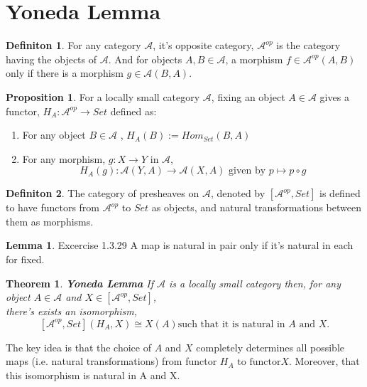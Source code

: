 \documentclass[18pt,a4paper]{article}
\newtheorem{theorem}{Theorem}[section]
\theoremstyle{definition}
\newtheorem{definition}{Definiton}[section]
\newtheorem{lemma}{Lemma}[definition]
\newtheorem{proop}{Proposition}[section]
\begin{document}
\section{Yoneda Lemma} %
\begin{definition} %
For any category $\mathcal{A} $, it's opposite category, $\mathcal{A}^{op}$
is the category having the objects of $\mathcal{A}$.
And for objects $A,B \in \mathcal{A} $, a morphism $f \in \mathcal{A}^{op} (A,B)$
only if there is a morphism $g \in \mathcal{A}(B,A)$.
\end{definition}

\begin{proop} %
	For a locally small category $\mathcal{A}$, fixing an object $A \in \mathcal{A} $ gives
	a functor, $H_A: \mathcal{A} ^{op} \rightarrow Set$ defined as:
	\begin{enumerate}[label=(\roman*)]
		\item For any object $B \in \mathcal{A} $ , $H_A(B):=Hom_{Set}(B,A)$
		\item For any morphism, $g : X \rightarrow Y $ in $\mathcal{A}$,
			\[H_A(g): \mathcal{A} (Y,A) \rightarrow \mathcal{A}(X,A)
				\text{ given by } p \mapsto p \circ g\]
	\end{enumerate}
\end{proop}
\begin{definition} %
	The category of presheaves on $\mathcal{A} $, denoted by $[\mathcal{A} ^{op},Set]$
	is defined to have functors from $\mathcal{A} ^{op}$ to $Set$ as objects,
	and natural transformations between them as morphisms.
\end{definition}

\begin{lemma}
	Excercise 1.3.29 A map is natural in pair only if it's natural in each for fixed.
\end{lemma}

\begin{theorem}{\textbf{Yoneda Lemma}} %
	If $\mathcal{A} $ is a locally small category then, for any object $A \in \mathcal{A} $
	and $X \in [ \mathcal{A}^{op},Set]$,\\ there's exists an isomorphism,
	\[ [ \mathcal{A} ^{op},Set ](H_A,X)\cong X(A) \text{such that it is natural in } A \text{ and } X.\]
\end{theorem}

The key idea is that the choice of $A$ and $X$ completely determines all possible maps
(i.e. natural transformations) from functor $H_A \text{ to functor} X$.
Moreover, that this isomorphism is natural in A and X.
\end{document}
